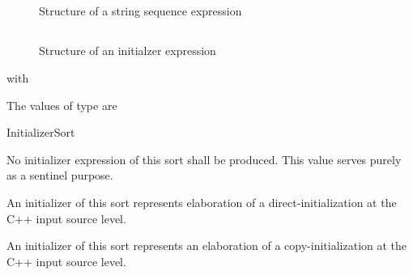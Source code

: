 

\subsection{}
\label{sec:ifc:ExprSort:StringSequence}

\begin{figure}[H]
	\centering
	\caption{Structure of a string sequence expression}
	\label{fig:ifc-string-sequence-structure}
\end{figure}



\subsection{}
\label{sec:ifc:ExprSort:Initializer}

\begin{figure}[H]
	\centering
	\caption{Structure of an initialzer expression}
	\label{fig:ifc-initializer-structure}
\end{figure}
with 

The values of type  are
\begin{SortEnum}{InitializerSort}
\end{SortEnum}

No initializer expression of this sort shall be produced.  This value serves purely as a sentinel purpose.

An initializer of this sort represents elaboration of a direct-initialization at the C++ input source level.

An initializer of this sort represents an elaboration of a copy-initialization at the C++ input source level.

